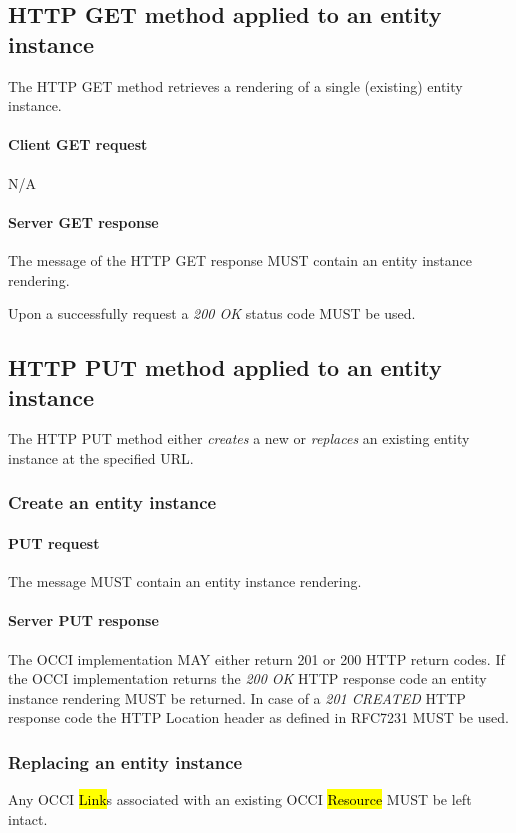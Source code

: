 \documentclass[10pt,a4paper]{article}
\begin{document}
\subsection{HTTP GET method applied to an entity instance}
The HTTP GET method retrieves a rendering of a single (existing) entity instance.

\paragraph{Client GET request}
N/A

\paragraph{Server GET response}
The message of the HTTP GET response MUST contain an entity instance rendering.

Upon a successfully request a \emph{200 OK} status code MUST be used.

\subsection{HTTP PUT method applied to an entity instance}
The HTTP PUT method either {\em creates} a new or {\em replaces} an existing entity instance at the specified URL.

\subsubsection{Create an entity instance}

\paragraph{PUT request}
The message MUST contain an entity instance rendering.

\paragraph{Server PUT response}
The OCCI implementation MAY either return 201 or 200 HTTP return codes. If the OCCI implementation
returns the \emph{200 OK} HTTP response code an entity instance rendering MUST be returned.
In case of a \emph{201 CREATED} HTTP response code the HTTP Location header as defined in RFC7231 \cite{rfc7231} MUST be used.

\subsubsection{Replacing an entity instance}
Any OCCI \hl{Link}s associated with an existing OCCI \hl{Resource} MUST be left intact.
\end{document}
